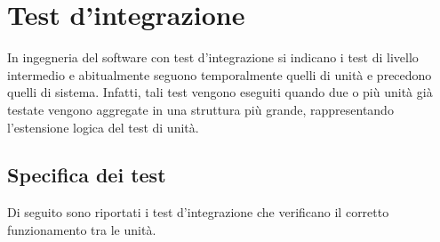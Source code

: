 \section{Test d'integrazione}\label{sec:test-d'integrazione}
In ingegneria del software con test d'integrazione si indicano i test di livello intermedio e abitualmente seguono temporalmente quelli di unità e precedono quelli di sistema.
Infatti, tali test vengono eseguiti quando due o più unità già testate vengono aggregate in una struttura più grande, rappresentando l'estensione logica del test di unità.


\setcounter{rowcount}{0}

\subsection{Specifica dei test}\label{subsec:specifica-dei-test-integrazione}
Di seguito sono riportati i test d'integrazione che verificano il corretto funzionamento tra le unità.
